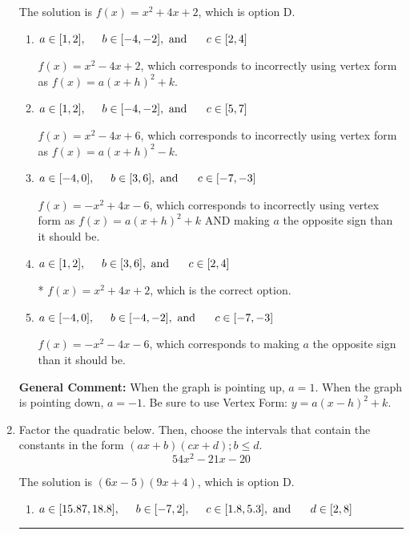 \documentclass{extbook}[14pt]
\newcommand{\litem}[1]{\item #1

\rule{\textwidth}{0.4pt}}
\begin{document}
\begin{enumerate}
{The solution is \( f(x) = x^{2} +4 x + 2 \), which is option D.\begin{enumerate}[label=\Alph*.]
\item \( a \in [1, 2], \hspace*{5mm} b \in [-4, -2], \text{ and } \hspace*{5mm} c \in [2, 4] \)

$f(x)=x^{2} -4 x + 2$, which corresponds to incorrectly using vertex form as $f(x) = a(x+h)^2+k$.
\item \( a \in [1, 2], \hspace*{5mm} b \in [-4, -2], \text{ and } \hspace*{5mm} c \in [5, 7] \)

$f(x)=x^{2} -4 x + 6$, which corresponds to incorrectly using vertex form as $f(x) = a(x+h)^2 - k$.
\item \( a \in [-4, 0], \hspace*{5mm} b \in [3, 6], \text{ and } \hspace*{5mm} c \in [-7, -3] \)

$f(x)=-x^{2} +4 x -6$, which corresponds to incorrectly using vertex form as $f(x) = a(x+h)^2+k$ AND making $a$ the opposite sign than it should be.
\item \( a \in [1, 2], \hspace*{5mm} b \in [3, 6], \text{ and } \hspace*{5mm} c \in [2, 4] \)

* $f(x)=x^{2} +4 x + 2$, which is the correct option.
\item \( a \in [-4, 0], \hspace*{5mm} b \in [-4, -2], \text{ and } \hspace*{5mm} c \in [-7, -3] \)

$f(x)=-x^{2} -4 x -6$, which corresponds to making $a$ the opposite sign than it should be.
\end{enumerate}

\textbf{General Comment:} When the graph is pointing up, $a=1$. When the graph is pointing down, $a=-1$. Be sure to use Vertex Form: $y = a(x-h)^2+k$.
}
\litem{
Factor the quadratic below. Then, choose the intervals that contain the constants in the form $(ax+b)(cx+d); b \leq d.$
\[ 54x^{2} -21 x -20 \]

The solution is \( (6x -5)(9x + 4) \), which is option D.\begin{enumerate}[label=\Alph*.]
\item \( a \in [15.87, 18.8], \hspace*{5mm} b \in [-7, 2], \hspace*{5mm} c \in [1.8, 5.3], \text{ and } \hspace*{5mm} d \in [2, 8] \)


\end{enumerate}}
\end{enumerate}
\end{document}
